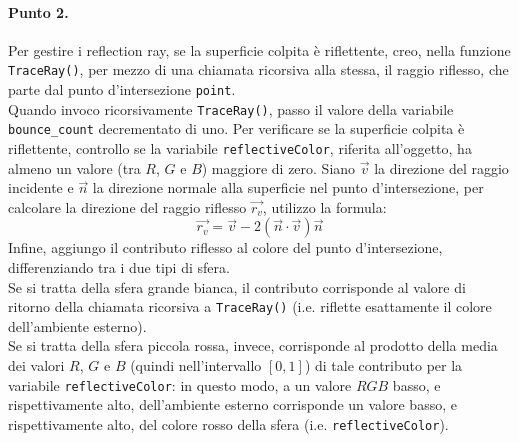 \documentclass[a4paper, 12pt]{article}
\begin{document}
\paragraph{Punto 2.}
Per gestire i reflection ray, se la superficie colpita è riflettente, creo, nella funzione \texttt{TraceRay()}, per mezzo di una chiamata ricorsiva alla stessa, il raggio riflesso, che parte dal punto d'intersezione \texttt{point}.\\
Quando invoco ricorsivamente \texttt{TraceRay()}, passo il valore della variabile \texttt{bounce\_count} decrementato di uno. Per verificare se la superficie colpita è riflettente, controllo se la variabile \texttt{reflectiveColor}, riferita all'oggetto, ha almeno un valore (tra $R$, $G$ e $B$) maggiore di zero. Siano $\vec{v}$ la direzione del raggio incidente e $\vec{n}$ la direzione normale alla superficie nel punto d'intersezione, per calcolare la direzione del raggio riflesso $\overrightarrow{r_v}$, utilizzo la formula:
\[ \overrightarrow{r_v} = \vec{v} - 2 (\vec{n} \cdot \vec{v}) \vec{n} \]
Infine, aggiungo il contributo riflesso al colore del punto d'intersezione, differenziando tra i due tipi di sfera.\\
Se si tratta della sfera grande bianca, il contributo corrisponde al valore di ritorno della chiamata ricorsiva a \texttt{TraceRay()} (i.e. riflette esattamente il colore dell'ambiente esterno).\\
Se si tratta della sfera piccola rossa, invece, corrisponde al prodotto della media dei valori $R$, $G$ e $B$ (quindi nell'intervallo $[0, 1]$) di tale contributo per la variabile \texttt{reflectiveColor}: in questo modo, a un valore $RGB$ basso, e rispettivamente alto, dell'ambiente esterno corrisponde un valore basso, e rispettivamente alto, del colore rosso della sfera (i.e. \texttt{reflectiveColor}).
\end{document}
